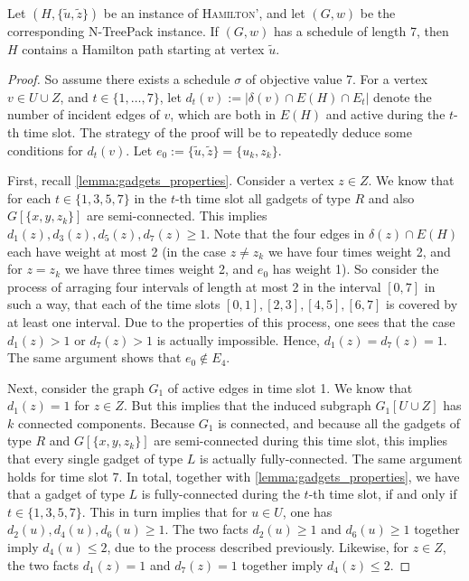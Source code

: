 \documentclass[runningheads]{llncs}
\newcommand{\set}[1]{\{ #1 \}}
\newcommand{\fromto}[2]{\set{#1, \ldots, #2}}
\newcommand{\xxxNTP}{{\sc N-TreePack}}
\begin{document}
\begin{lemma}
\label{lemma:inapprox-only-if}
Let $(H, \set{\tilde{u}, \tilde{z}})$ be an instance of \textsc{Hamilton'}, and let $(G, w)$ be the corresponding {\xxxNTP} instance. If $(G, w)$ has a schedule of length 7, then $H$ contains a Hamilton path starting at vertex $\tilde{u}$.
\end{lemma}
\begin{proof}
 So assume there exists a schedule $\sigma$ of objective value 7. For a vertex $v \in U \cup Z$, and $t \in \fromto{1}{7}$, let $d_t(v) := |\delta(v) \cap E(H) \cap E_t|$ denote the number of incident edges of $v$, which are both in $E(H)$ and active during the $t$-th time slot. The strategy of the proof will be to repeatedly deduce some conditions for $d_t(v)$. Let $e_0 := \set{\tilde{u}, \tilde{z}} = \set{u_k, z_k}$.

First, recall \cref{lemma:gadgets_properties}. Consider a vertex $z \in Z$. We know that for each $t \in \set{1, 3, 5, 7}$ in the $t$-th time slot all gadgets of type $R$ and also $G[\set{x,y,z_k}]$ are semi-connected. This implies $d_1(z), d_3(z), d_5(z), d_7(z) \geq 1$.  Note that the four edges in $\delta(z) \cap E(H)$ each have weight at most 2 (in the case $z \neq z_k$ we have four times weight 2, and for $z = z_k$ we have three times weight 2, and $e_0$ has weight 1). So consider the process of arraging four intervals of length at most 2 in the interval $[0, 7]$ in such a way, that each of the time slots $[0,1], [2,3], [4,5], [6,7]$ is covered by at least one interval. Due to the properties of this process, one sees that the case $d_1(z) > 1$ or $d_7(z) > 1$ is actually impossible. Hence, $d_1(z) = d_7(z) = 1$. The same argument shows that $e_0 \not\in E_4$.

Next, consider the graph $G_1$ of active edges in time slot 1. We know that  $d_1(z) = 1$ for $z \in Z$. But this implies that the induced subgraph $G_1[U \cup Z]$ has $k$ connected components. Because $G_1$ is connected, and because all the gadgets of type $R$ and $G[\set{x, y, z_k}]$ are semi-connected during this time slot, this implies that every single gadget of type $L$ is actually fully-connected. The same argument holds for time slot 7. In total, together with \cref{lemma:gadgets_properties}, we have that a gadget of type $L$ is fully-connected during the $t$-th time slot, if and only if $t \in \set{1, 3, 5, 7}$. This in turn implies that for $u \in U$, one has $d_2(u), d_4(u), d_6(u) \geq 1$. The two facts $d_2(u) \geq 1$ and $d_6(u) \geq 1$ together imply $d_4(u) \leq 2$, due to the process described previously. Likewise, for $z \in Z$, the two facts $d_1(z) = 1$ and $d_7(z) = 1$ together imply $d_4(z) \leq 2$.


\end{proof}
\end{document}
